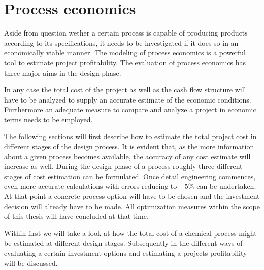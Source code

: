 \chapter{Process economics}
\label{chp:ProcesEconomics}

Aside from question wether a certain process is capable of producing products according to its 
specifications, it needs to be investigated if it does so in an economically viable manner. The modeling 
of process economics is a powerful tool to estimate project profitability. The evaluation of process 
economics has three major aims in the design phase. 

%

In any case the total cost of the project as well as the cash flow structure will have to be analyzed to supply 
an accurate estimate of the economic conditions. Furthermore an adequate measure to compare and 
analyze a project in economic terms needs to be employed. 

The following sections will first describe how to estimate the total project cost in different stages of the 
design process. It is evident that, as the more information about a given process becomes available, the 
accuracy of any cost estimate will increase as well. During the design phase of a process roughly three
different stages of cost estimation can be formulated. 
Once detail engineering commences, even more accurate calculations with errors reducing to $\pm 5\%$
can be undertaken\cite{Peters.2003}. At that point a concrete process option will have to be chosen and 
the investment decision will already have to be made. All optimization measures within the scope of this 
thesis will have concluded at that time. 

Within  first we will take a look at how the total cost of a chemical process might be 
estimated at different design stages. Subsequently in  the different ways
of evaluating a certain investment options and estimating a projects profitability will be discussed. 

